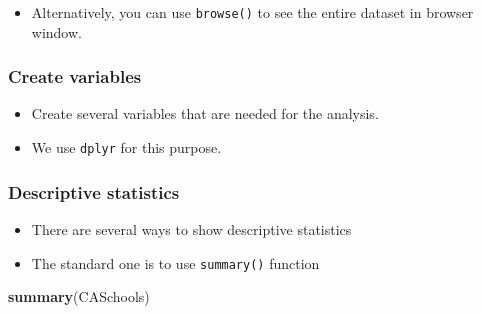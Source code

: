 \documentclass[]{book}
\newenvironment{Shaded}{\begin{snugshade}}{\end{snugshade}}
\newcommand{\KeywordTok}[1]{\textcolor[rgb]{0.13,0.29,0.53}{\textbf{#1}}}
\newcommand{\DataTypeTok}[1]{\textcolor[rgb]{0.13,0.29,0.53}{#1}}
\newcommand{\DecValTok}[1]{\textcolor[rgb]{0.00,0.00,0.81}{#1}}
\newcommand{\StringTok}[1]{\textcolor[rgb]{0.31,0.60,0.02}{#1}}
\newcommand{\OperatorTok}[1]{\textcolor[rgb]{0.81,0.36,0.00}{\textbf{#1}}}
\newcommand{\NormalTok}[1]{#1}
\providecommand{\tightlist}{%
  \setlength{\itemsep}{0pt}\setlength{\parskip}{0pt}}
\begin{document}
\begin{itemize}
\tightlist
\item
  Alternatively, you can use \texttt{browse()} to see the entire dataset
  in browser window.
\end{itemize}

\subsubsection{Create variables}\label{create-variables}

\begin{itemize}
\tightlist
\item
  Create several variables that are needed for the analysis.
\item
  We use \texttt{dplyr} for this purpose.
\end{itemize}

\begin{Shaded}
\end{Shaded}

\subsubsection{Descriptive statistics}\label{descriptive-statistics}

\begin{itemize}
\tightlist
\item
  There are several ways to show descriptive statistics
\item
  The standard one is to use \texttt{summary()} function
\end{itemize}

\begin{Shaded}
\begin{Highlighting}[]
\KeywordTok{summary}\NormalTok{(CASchools)}
\end{Highlighting}
\end{Shaded}
\end{document}
